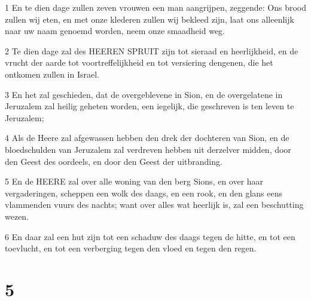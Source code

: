 \par 1 En te dien dage zullen zeven vrouwen een man aangrijpen, zeggende: Ons brood zullen wij eten, en met onze klederen zullen wij bekleed zijn, laat ons alleenlijk naar uw naam genoemd worden, neem onze smaadheid weg.
\par 2 Te dien dage zal des HEEREN SPRUIT zijn tot sieraad en heerlijkheid, en de vrucht der aarde tot voortreffelijkheid en tot versiering dengenen, die het ontkomen zullen in Israel.
\par 3 En het zal geschieden, dat de overgeblevene in Sion, en de overgelatene in Jeruzalem zal heilig geheten worden, een iegelijk, die geschreven is ten leven te Jeruzalem;
\par 4 Als de Heere zal afgewassen hebben den drek der dochteren van Sion, en de bloedschulden van Jeruzalem zal verdreven hebben uit derzelver midden, door den Geest des oordeels, en door den Geest der uitbranding.
\par 5 En de HEERE zal over alle woning van den berg Sions, en over haar vergaderingen, scheppen een wolk des daags, en een rook, en den glans eens vlammenden vuurs des nachts; want over alles wat heerlijk is, zal een beschutting wezen.
\par 6 En daar zal een hut zijn tot een schaduw des daags tegen de hitte, en tot een toevlucht, en tot een verberging tegen den vloed en tegen den regen.

\chapter{5}

